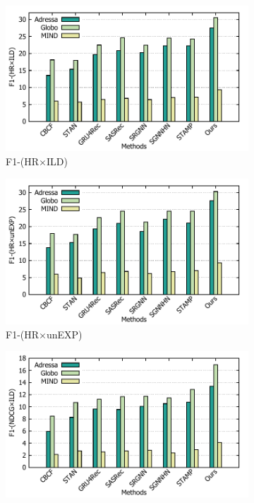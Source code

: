 \begin{figure}
  \begin{subfigure}[b]{0.8\columnwidth}
  \centering
  \includegraphics[width=\columnwidth]{fig/hr-ild.pdf}
  \caption{F1-(HR$\times$ILD)}
  \label{fig:hr}
  \end{subfigure}
  \hspace*{5mm}
  \begin{subfigure}[b]{0.8\columnwidth}
  \centering
  \includegraphics[width=\columnwidth]{fig/hr-unexp.pdf}
  \caption{F1-(HR$\times$unEXP)}
  \label{fig:ndcg}
  \end{subfigure}
  \hfill
  \begin{subfigure}[b]{0.8\columnwidth}
  \centering
  \includegraphics[width=\columnwidth]{fig/ndcg-ild.pdf}

\end{subfigure}
\end{figure}
